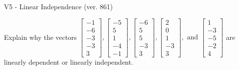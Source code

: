 \begin{exercise}
  \begin{exerciseTitle}V5 - Linear Independence (ver. 861)\end{exerciseTitle}
  \begin{exerciseStatement}
    Explain why the vectors \(\left[\begin{array}{r}
-1 \\
-6 \\
-3 \\
-3 \\
3
\end{array}\right] , \left[\begin{array}{r}
-5 \\
5 \\
1 \\
-4 \\
-1
\end{array}\right] , \left[\begin{array}{r}
-6 \\
5 \\
5 \\
-3 \\
3
\end{array}\right] , \left[\begin{array}{r}
2 \\
0 \\
1 \\
-3 \\
3
\end{array}\right] , \text{ and } \left[\begin{array}{r}
1 \\
-3 \\
-5 \\
-2 \\
4
\end{array}\right]\) are linearly dependent or linearly independent.	



\end{exerciseStatement}
\end{exercise}
